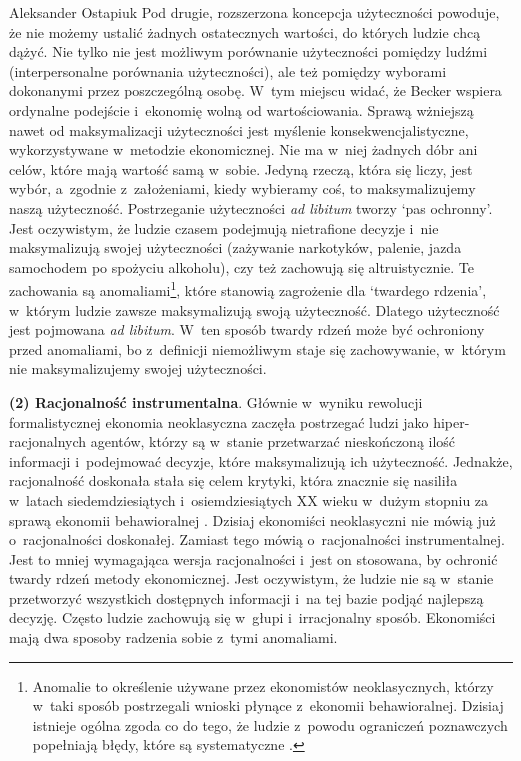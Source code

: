 \begin{artplenv}{Aleksander Ostapiuk}
Pod drugie, rozszerzona koncepcja użyteczności powoduje, że nie możemy ustalić żadnych ostatecznych wartości, do których
ludzie chcą dążyć. Nie tylko nie jest możliwym porównanie użyteczności pomiędzy ludźmi (interpersonalne
porównania użyteczności), ale też pomiędzy wyborami dokonanymi przez poszczególną osobę. W~tym miejscu widać, że Becker
wspiera ordynalne podejście i~ekonomię wolną od wartościowania. Sprawą wżniejszą nawet od maksymalizacji użyteczności
jest myślenie konsekwencjalistyczne, wykorzystywane w~metodzie ekonomicznej. Nie ma w~niej żadnych dóbr ani celów, które
mają wartość samą w~sobie. Jedyną rzeczą, która się liczy, jest wybór, a~zgodnie z~założeniami, kiedy wybieramy coś, to
maksymalizujemy naszą użyteczność. Postrzeganie użyteczności \textit{ad libitum }tworzy `pas ochronny'. Jest
oczywistym, że ludzie czasem podejmują nietrafione decyzje i~nie maksymalizują swojej użyteczności (zażywanie
narkotyków, palenie, jazda samochodem po spożyciu alkoholu), czy też zachowują się altruistycznie. Te zachowania są
anomaliami\footnote{Anomalie to określenie używane przez ekonomistów neoklasycznych, którzy w~taki sposób postrzegali
wnioski płynące z~ekonomii behawioralnej. Dzisiaj istnieje ogólna zgoda co do tego, że ludzie z~powodu ograniczeń
poznawczych popełniają błędy, które są systematyczne
\parencite{thaler_misbehaving:_2015}.
}, które stanowią
zagrożenie dla `twardego rdzenia', w~którym ludzie zawsze maksymalizują swoją użyteczność. Dlatego użyteczność jest
pojmowana \textit{ad libitum}. W~ten sposób twardy rdzeń może być ochroniony przed anomaliami, bo z~definicji
niemożliwym staje się zachowywanie, w~którym nie maksymalizujemy swojej użyteczności. 

\textbf{(2) Racjonalność instrumentalna}. Głównie w~wyniku rewolucji formalistycznej ekonomia
neoklasyczna zaczęła postrzegać ludzi jako hiper-racjonalnych agentów, którzy są w~stanie przetwarzać nieskończoną
ilość informacji i~podejmować decyzje, które maksymalizują ich użyteczność. Jednakże, racjonalność doskonała
stała się celem krytyki, która znacznie się nasiliła w~latach siedemdziesiątych i~osiemdziesiątych XX wieku w~dużym
stopniu za sprawą ekonomii behawioralnej
\parencite{thaler_misbehaving:_2015}.
Dzisiaj ekonomiści neoklasyczni nie
mówią już o~racjonalności doskonałej. Zamiast tego mówią o~racjonalności instrumentalnej. Jest to mniej wymagająca
wersja racjonalności i~jest on stosowana, by ochronić twardy rdzeń metody ekonomicznej. Jest oczywistym, że ludzie nie
są w~stanie przetworzyć wszystkich dostępnych informacji i~na tej bazie podjąć najlepszą decyzję. Często ludzie
zachowują się w~głupi i~irracjonalny sposób. Ekonomiści mają dwa sposoby radzenia sobie z~tymi anomaliami.


\end{artplenv}
